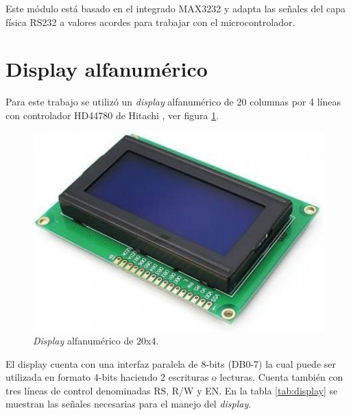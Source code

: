 Este módulo está basado en el integrado MAX3232 \citep{MAX3232} y adapta las señales del capa física RS232 a valores acordes para trabajar con el microcontrolador.

\section{Display alfanumérico}

Para este trabajo se utilizó un \textit{display} alfanumérico de 20 columnas por 4 líneas con controlador HD44780 de Hitachi \citep{HD44780}, ver figura \ref{fig:display}.

\begin{figure}[htpb]
	\centering
	\includegraphics[scale=0.7]{./Figures/display.jpg}
	\caption{\textit{Display} alfanumérico de 20x4.}
	\label{fig:display}
\end{figure}

El display cuenta con una interfaz paralela de 8-bits (DB0-7) la cual puede ser utilizada en formato 4-bits haciendo 2 escrituras o lecturas. Cuenta también con tres líneas de control denominadas RS, R/W y EN. En la tabla \ref{tab:display} se muestran las señales necesarias para el manejo del \textit{display}.

